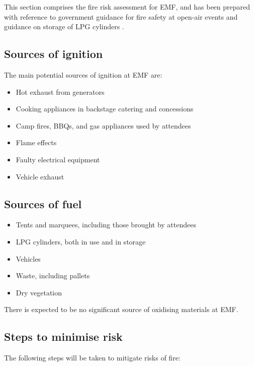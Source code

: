 This section comprises the fire risk assessment for EMF, and has been prepared with reference
to government guidance for fire safety at open-air events \cite{firesafety} and guidance on storage
of LPG cylinders \cite{lpgstorage}.

\subsection{Sources of ignition}

The main potential sources of ignition at EMF are:

\begin{itemize}
    \tightlist
    \item Hot exhaust from generators
    \item Cooking appliances in backstage catering and concessions
    \item Camp fires, BBQs, and gas appliances used by attendees
    \item Flame effects
    \item Faulty electrical equipment
    \item Vehicle exhaust
\end{itemize}

\subsection{Sources of fuel}
\begin{itemize}
    \tightlist
    \item Tents and marquees, including those brought by attendees
    \item LPG cylinders, both in use and in storage
    \item Vehicles
    \item Waste, including pallets
    \item Dry vegetation
\end{itemize}

There is expected to be no significant source of oxidising materials at EMF.

\subsection{Steps to minimise risk}
The following steps will be taken to mitigate risks of fire:

